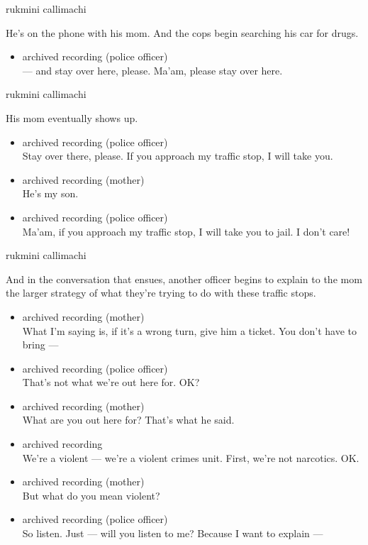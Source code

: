 rukmini callimachi

He's on the phone with his mom. And the cops begin searching his car for
drugs.

\begin{itemize}
\tightlist
\item
  archived recording (police officer)\\
  --- and stay over here, please. Ma'am, please stay over here.
\end{itemize}

rukmini callimachi

His mom eventually shows up.

\begin{itemize}
\item
  archived recording (police officer)\\
  Stay over there, please. If you approach my traffic stop, I will take
  you.
\item
  archived recording (mother)\\
  He's my son.
\item
  archived recording (police officer)\\
  Ma'am, if you approach my traffic stop, I will take you to jail. I
  don't care!
\end{itemize}

rukmini callimachi

And in the conversation that ensues, another officer begins to explain
to the mom the larger strategy of what they're trying to do with these
traffic stops.

\begin{itemize}
\item
  archived recording (mother)\\
  What I'm saying is, if it's a wrong turn, give him a ticket. You don't
  have to bring ---
\item
  archived recording (police officer)\\
  That's not what we're out here for. OK?
\item
  archived recording (mother)\\
  What are you out here for? That's what he said.
\item
  archived recording\\
  We're a violent --- we're a violent crimes unit. First, we're not
  narcotics. OK.
\item
  archived recording (mother)\\
  But what do you mean violent?
\item
  archived recording (police officer)\\
  So listen. Just --- will you listen to me? Because I want to explain
  ---
\end{itemize}


